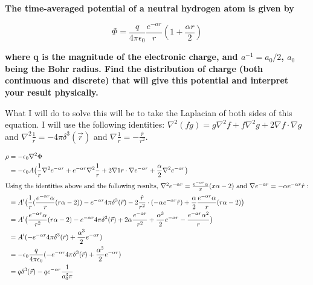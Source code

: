 \begin{homeworkProblem}

\textbf{The time-averaged potential of a neutral hydrogen atom is given by }

\begin{equation}
\Phi = \frac{q}{4\pi\epsilon_0}\frac{e^{-\alpha r}}{r}(1+\frac{\alpha r}{2})
\end{equation}
 
\textbf{where q is the magnitude of the electronic charge, and $a^{-1} = a_0/2$, $a_0$ being the 
Bohr radius. Find the distribution of charge (both continuous and discrete) that will 
give this potential and interpret your result physically. }
\\ \par
What I will do to solve this will be to take the Laplacian of both sides of this equation. I will use the following identities: $\nabla^2 (f g) = g \nabla^2 f + f \nabla^2 g + 2 \nabla f \cdot \nabla g $ and $\nabla^2 \frac{1}{r} = -4\pi \delta^3(\vec{r})$ and $\nabla \frac{1}{r} = -\frac{\hat{r}}{r^2}$.

\begin{align}
	\rho &= -\epsilon_0 \nabla^2 \Phi \nonumber \\
	&=-\epsilon_0 A \big(\frac{1}{r}\nabla^2 e^{-\alpha r} + e^{-\alpha r}\nabla^2 \frac{1}{r} + 2 \nabla {1}{r} \cdot \nabla e^{-\alpha r} + \frac{\alpha}{2}\nabla^2 e^{-\alpha r}\big) \nonumber \\
	\intertext{Using the identities above and the following results, $\nabla^2 e^{- \alpha r} = \frac{e^{-\alpha r}\alpha}{x}(x\alpha -2)$ and $\nabla e^{-\alpha r} = - \alpha e^{-\alpha r} \hat{r}$ :}
		&= A' \big(\frac{1}{r}(\frac{e^{-\alpha r}\alpha}{r}(r\alpha -2)) - e^{-\alpha r}4\pi \delta^3(\vec{r})-2	\frac{\hat{r}}{r^2} \cdot (-\alpha e^{-\alpha r} \hat{r}) + \frac{\alpha}{2}\frac{e^{-\alpha r}\alpha}{r}(r\alpha -2)\big) \nonumber \\
	&= A' \big( \frac{e^{-\alpha r}\alpha}{r^2}(r\alpha -2) - e^{-\alpha r}4\pi \delta^3(\vec{r}) + 2 \alpha \frac{e^{-\alpha r}}{r^2} + \frac{\alpha^3}{2} e^{-\alpha r} -\frac{e^{-\alpha r} \alpha^2}{r} \big) \nonumber \\
	&= A' (-e^{-\alpha r} 4\pi \delta^3(\vec{r}) + \frac{\alpha^3}{2}e^{-\alpha r}) \nonumber \\
	&= -\epsilon_0 \frac{q}{4\pi \epsilon_0} (-e^{-\alpha r} 4\pi \delta^3(\vec{r}) + \frac{\alpha^3}{2}e^{-\alpha r}) \nonumber \\
	&= q \delta^3(\vec{r}) - q e^{-\alpha r} \frac{1}{a_0^3 \pi} \nonumber
\end{align}


\end{homeworkProblem}
